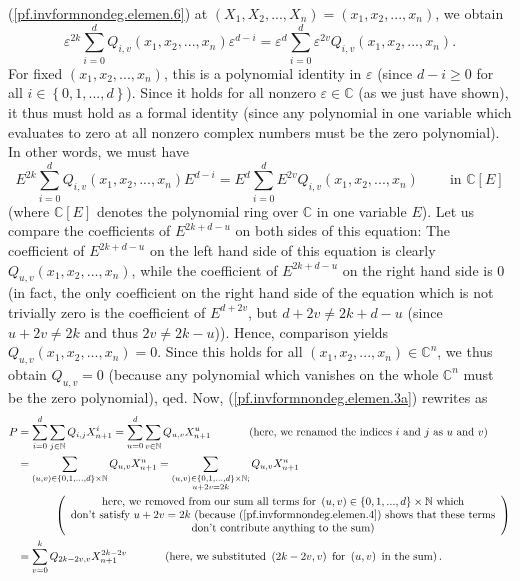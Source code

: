\documentclass
[numbers=enddot,12pt,final,onecolumn,german,notitlepage]{scrartcl}%
\theoremstyle{definition}
\begin{document}
{(\ref{pf.invformnondeg.elemen.6}) at $\left(  X_{1},X_{2},...,X_{n}\right)
=\left(  x_{1},x_{2},...,x_{n}\right)  $, we obtain
\[
\varepsilon^{2k}\sum\limits_{i=0}^{d}Q_{i,v}\left(  x_{1},x_{2},...,x_{n}%
\right)  \varepsilon^{d-i}=\varepsilon^{d}\sum\limits_{i=0}^{d}\varepsilon
^{2v}Q_{i,v}\left(  x_{1},x_{2},...,x_{n}\right)  .
\]
For fixed $\left(  x_{1},x_{2},...,x_{n}\right)  $, this is a polynomial
identity in $\varepsilon$ (since $d-i\geq0$ for all $i\in\left\{
0,1,...,d\right\}  $). Since it holds for all nonzero $\varepsilon
\in\mathbb{C}$ (as we just have shown), it thus must hold as a formal identity
(since any polynomial in one variable which evaluates to zero at all nonzero
complex numbers must be the zero polynomial). In other words, we must have%
\[
E^{2k}\sum\limits_{i=0}^{d}Q_{i,v}\left(  x_{1},x_{2},...,x_{n}\right)
E^{d-i}=E^{d}\sum\limits_{i=0}^{d}E^{2v}Q_{i,v}\left(  x_{1},x_{2}%
,...,x_{n}\right)  \ \ \ \ \ \ \ \ \ \ \text{in }\mathbb{C}\left[  E\right]
\]
(where $\mathbb{C}\left[  E\right]  $ denotes the polynomial ring over
$\mathbb{C}$ in one variable $E$). Let us compare the coefficients of
$E^{2k+d-u}$ on both sides of this equation: The coefficient of $E^{2k+d-u}$
on the left hand side of this equation is clearly $Q_{u,v}\left(  x_{1}%
,x_{2},...,x_{n}\right)  $, while the coefficient of $E^{2k+d-u}$ on the right
hand side is $0$ (in fact, the only coefficient on the right hand side of the
equation which is not trivially zero is the coefficient of $E^{d+2v}$, but
$d+2v\neq2k+d-u$ (since $u+2v\neq2k$ and thus $2v\neq2k-u$)). Hence,
comparison yields $Q_{u,v}\left(  x_{1},x_{2},...,x_{n}\right)  =0$. Since
this holds for all $\left(  x_{1},x_{2},...,x_{n}\right)  \in\mathbb{C}^{n}$,
we thus obtain $Q_{u,v}=0$ (because any polynomial which vanishes on the whole
$\mathbb{C}^{n}$ must be the zero polynomial), qed.} Now,
(\ref{pf.invformnondeg.elemen.3a}) rewrites as%
\begin{align*}
P  & =\sum\limits_{i=0}^{d}\sum\limits_{j\in\mathbb{N}}Q_{i,j}X_{n+1}^{i}%
=\sum\limits_{u=0}^{d}\sum\limits_{v\in\mathbb{N}}Q_{u,v}X_{n+1}%
^{u}\ \ \ \ \ \ \ \ \ \ \left(  \text{here, we renamed the indices }i\text{
and }j\text{ as }u\text{ and }v\right)  \\
& =\sum\limits_{\left(  u,v\right)  \in\left\{  0,1,...,d\right\}
\times\mathbb{N}}Q_{u,v}X_{n+1}^{u}=\sum\limits_{\substack{\left(  u,v\right)
\in\left\{  0,1,...,d\right\}  \times\mathbb{N};\\u+2v=2k}}Q_{u,v}X_{n+1}%
^{u}\\
& \ \ \ \ \ \ \ \ \ \ \left(
\begin{array}
[c]{c}%
\text{here, we removed from our sum all terms for }\left(  u,v\right)
\in\left\{  0,1,...,d\right\}  \times\mathbb{N}\text{ which}\\
\text{don't satisfy }u+2v=2k\text{ (because (\ref{pf.invformnondeg.elemen.4})
shows that these terms}\\
\text{don't contribute anything to the sum)}%
\end{array}
\right)  \\
& =\sum\limits_{v=0}^{k}Q_{2k-2v,v}X_{n+1}^{2k-2v}\ \ \ \ \ \ \ \ \ \ \left(
\text{here, we substituted }\left(  2k-2v,v\right)  \text{ for }\left(
u,v\right)  \text{ in the sum}\right)  .
\end{align*}
\end{document}

